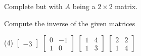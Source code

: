 \documentclass{ximera}
\begin{document}
\begin{exercise}
    Complete  but with $A$ being a $2 \times 2$ matrix.
\end{exercise}

\begin{exercise}
    Compute the inverse of the given matrices
    \begin{tasks}(4)
        \task
        $\begin{bmatrix}
        -3
        \end{bmatrix}$
        \task
        $\begin{bmatrix}
        0 & -1 \\
        1 & 0
        \end{bmatrix}$
        \task
        $\begin{bmatrix}
        1 & 4 \\
        1 & 3
        \end{bmatrix}$
        \task
        $\begin{bmatrix}
        2 & 2 \\
        1 & 4
        \end{bmatrix}$
    \end{tasks}
\end{exercise}
\end{document}
